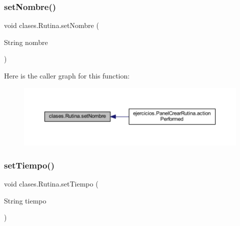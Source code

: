 \mbox{\label{classclases_1_1_rutina_aea665dc29f39c2b6439a3b4a2bd94d90}} 
\subsubsection{\texorpdfstring{set\+Nombre()}{setNombre()}}
{\footnotesize\ttfamily void clases.\+Rutina.\+set\+Nombre (\begin{DoxyParamCaption}\item[{String}]{nombre }\end{DoxyParamCaption})}

Here is the caller graph for this function\+:
\nopagebreak
\begin{figure}[H]
\begin{center}
\leavevmode
\includegraphics[width=350pt]{classclases_1_1_rutina_aea665dc29f39c2b6439a3b4a2bd94d90_icgraph}
\end{center}
\end{figure}
\mbox{\label{classclases_1_1_rutina_a631c31359d620089ee653561683efc61}} 
\subsubsection{\texorpdfstring{set\+Tiempo()}{setTiempo()}}
{\footnotesize\ttfamily void clases.\+Rutina.\+set\+Tiempo (\begin{DoxyParamCaption}\item[{String}]{tiempo }\end{DoxyParamCaption})}

\mbox{\label{classclases_1_1_rutina_a0055e6a852f1cf59ffa9dfcae300d70d}} 
